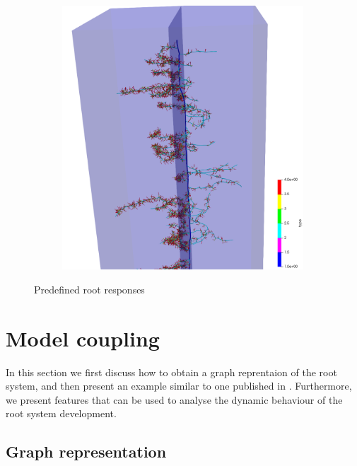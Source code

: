 \documentclass[a4paper]{article}
\begin{document}
\begin{figure}
\begin{subfigure}[c]{0.3\textwidth}
 \label{fig:insertion}
\end{subfigure}
\begin{subfigure}[c]{0.3\textwidth}
\includegraphics[width=0.99\textwidth]{example4b3.png}
 \label{fig:probability}
\end{subfigure}
\caption{Predefined root responses}
\end{figure}








\section{Model coupling}

In this section we first discuss how to obtain a graph reprentaion of the root system, and then present an example similar to one published in \cite{}. 
Furthermore, we present features that can be used to analyse the dynamic behaviour of the root system development.

\subsection{Graph representation}
\end{document}
